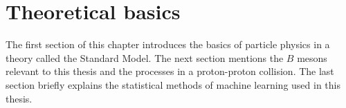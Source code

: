 \chapter{Theoretical basics}

The first section of this chapter introduces the basics of particle physics in a theory called the Standard Model.
The next section mentions the $B$ mesons relevant to this thesis and the processes in a proton-proton collision.
The last section briefly explains the statistical methods of machine learning used in this thesis.




